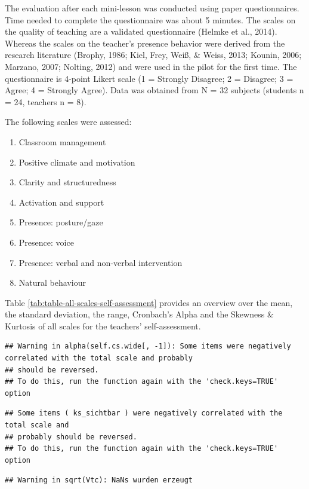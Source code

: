 \documentclass[
  english,
  man,floatsintext]{apa6}
\providecommand{\tightlist}{%
  \setlength{\itemsep}{0pt}\setlength{\parskip}{0pt}}
\begin{document}
The evaluation after each mini-lesson was conducted using paper questionnaires. Time needed to complete the questionnaire was about 5 minutes.
The scales on the quality of teaching are a validated questionnaire (Helmke et al., 2014). Whereas the scales on the teacher's presence behavior were derived from the research literature (Brophy, 1986; Kiel, Frey, Weiß, \& Weiss, 2013; Kounin, 2006; Marzano, 2007; Nolting, 2012) and were used in the pilot for the first time. The questionnaire is 4-point Likert scale (1 = Strongly Disagree; 2 = Disagree; 3 = Agree; 4 = Strongly Agree). Data was obtained from N = 32 subjects (students n = 24, teachers n = 8).

The following scales were assessed:

\begin{enumerate}
\def\labelenumi{(\arabic{enumi})}
\tightlist
\item
  Classroom management
\item
  Positive climate and motivation
\item
  Clarity and structuredness
\item
  Activation and support
\item
  Presence: posture/gaze
\item
  Presence: voice
\item
  Presence: verbal and non-verbal intervention
\item
  Natural behaviour
\end{enumerate}

Table \ref{tab:table-all-scales-self-assessment} provides an overview over the mean, the standard deviation, the range, Cronbach's Alpha and the Skewness \& Kurtosis of all scales for the teachers' self-assessment.

\begin{verbatim}
## Warning in alpha(self.cs.wide[, -1]): Some items were negatively correlated with the total scale and probably 
## should be reversed.  
## To do this, run the function again with the 'check.keys=TRUE' option
\end{verbatim}

\begin{verbatim}
## Some items ( ks_sichtbar ) were negatively correlated with the total scale and 
## probably should be reversed.  
## To do this, run the function again with the 'check.keys=TRUE' option
\end{verbatim}

\begin{verbatim}
## Warning in sqrt(Vtc): NaNs wurden erzeugt
\end{verbatim}
\end{document}
